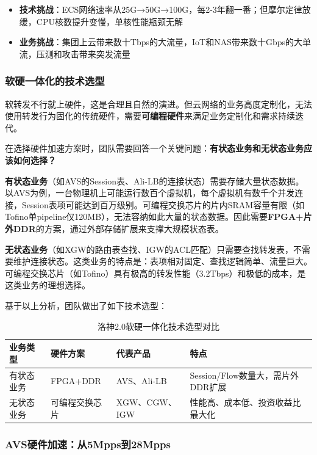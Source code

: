 \begin{itemize}
    \item \textbf{技术挑战}：ECS网络速率从25G→50G→100G，每2-3年翻一番；但摩尔定律放缓，CPU核数提升变慢，单核性能瓶颈无解
    \item \textbf{业务挑战}：集团上云带来数十Tbps的大流量，IoT和NAS带来数十Gbps的大单流，压测和攻击带来突发流量
\end{itemize}

\subsubsection{软硬一体化的技术选型}

软转发不行就上硬件，这是合理且自然的演进。但云网络的业务高度定制化，无法使用转发行为固化的传统硬件，需要\textbf{可编程硬件}来满足业务定制化和需求持续迭代。

在选择硬件加速方案时，团队需要回答一个关键问题：\textbf{有状态业务和无状态业务应该如何选择？}

\textbf{有状态业务}（如AVS的Session表、Ali-LB的连接状态）需要存储大量状态数据。以AVS为例，一台物理机上可能运行数百个虚拟机，每个虚拟机有数千个并发连接，Session表项可能达到百万级别。可编程交换芯片的片内SRAM容量有限（如Tofino单pipeline仅120MB），无法容纳如此大量的状态数据。因此需要\textbf{FPGA+片外DDR}的方案，通过外部存储扩展来支撑大规模状态表。

\textbf{无状态业务}（如XGW的路由表查找、IGW的ACL匹配）只需要查找转发表，不需要维护连接状态。这类业务的特点是：表项相对固定、查找逻辑简单、流量巨大。可编程交换芯片（如Tofino）具有极高的转发性能（3.2Tbps）和极低的成本，是这类业务的理想选择。

基于以上分析，团队做出了如下技术选型：

\begin{table}[htbp]
\centering
\caption{洛神2.0软硬一体化技术选型对比}
\begin{tabular}{|l|l|l|l|}
\hline
\textbf{业务类型} & \textbf{硬件方案} & \textbf{代表产品} & \textbf{特点} \\
\hline
有状态业务 & FPGA+DDR & AVS、Ali-LB & Session/Flow数量大，需片外DDR扩展 \\
\hline
无状态业务 & 可编程交换芯片 & XGW、CGW、IGW & 性能高、成本低、投资收益比最大化 \\
\hline
\end{tabular}
\end{table}

\subsubsection{AVS硬件加速：从5Mpps到28Mpps}

